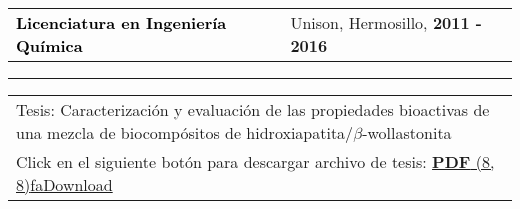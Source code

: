 \documentclass[10pt,A4]{article}
\newcommand{\mpwidth}{\linewidth-\fboxsep-\fboxsep}
\newcommand{\tzlarrow}{(0,0) -- (0.2,0) -- (0.3,0.2) -- (0.2,0.4) -- (0,0.4) -- (0.1,0.2) -- cycle;}
\newcommand{\larrow}[1]
{\begin{tikzpicture}[scale=0.58]
	 \filldraw[fill=#1!100,draw=#1!100!black]  \tzlarrow
 \end{tikzpicture}
}
\newcommand{\cvevent}[5]
{
\vspace{8pt}
	\begin{tabular*}{1\mpwidth}{p{0.55\mpwidth}  x{0.42\mpwidth}}
 	\textcolor{black}{\textbf{#2}} & \textcolor{softcol}{#3}, \textcolor{darkcol}{\textbf{#1}}

	\end{tabular*}
\vspace{-12pt}
\textcolor{softcol}{\hrule}
\vspace{6pt}
	\begin{tabular*}{0.5\mpwidth}{p{\mpwidth}}
\larrow{softcol}  #4\\[3pt]
\larrow{softcol}  #5\\[6pt]
	\end{tabular*}

}
\newcommand{\icon}[3]{\makebox(#2, #2){\textcolor{#3}{\csname fa#1\endcsname}}}	%
\begin{document}
{\begin{minipage}[c][0.96\textheight][t]{0.7\linewidth}
%
\cvevent{2011 - 2016}{Licenciatura en Ingenier\'ia Qu\'imica}{Unison, Hermosillo}{
	Tesis: Caracterizaci\'on y evaluaci\'on de las propiedades bioactivas de una mezcla de biocomp\'ositos de hidroxiapatita/$\beta$-wollastonita
}
{
	Click en el siguiente bot\'on para descargar archivo de tesis: \hspace{10.5mm} \href{https://raw.githubusercontent.com/alanmatzumiya/alanmatzumiya.github.io/main/assets/portfolio/bachelor/thesis.pdf}{\colorbox{darkcol}{\colorbox{lightcol}{\textcolor{fgreycol}{\hspace{3mm}\textbf{PDF}} \hspace{1.5mm} \icon{Download}{8}{fgreycol}\hspace{3mm}}}}
}


\end{minipage}}%
\end{document}
